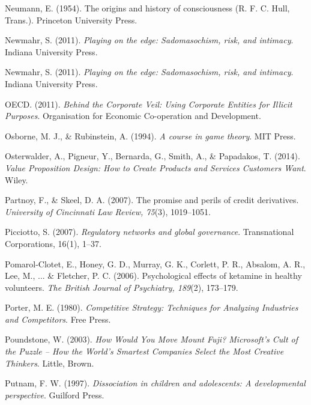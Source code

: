 \begin{thebibliography}{}
    Neumann, E. (1954). The origins and history of consciousness (R. F. C. Hull, Trans.). Princeton University Press.

    Newmahr, S. (2011). \textit{Playing on the edge: Sadomasochism, risk, and intimacy}. Indiana University Press.

    Newmahr, S. (2011). \textit{Playing on the edge: Sadomasochism, risk, and intimacy}. Indiana University Press.


    OECD. (2011). \textit{Behind the Corporate Veil: Using Corporate Entities for Illicit Purposes}. Organisation for Economic Co-operation and Development.

    Osborne, M. J., \& Rubinstein, A. (1994). \textit{A course in game theory}. MIT Press.

    Osterwalder, A., Pigneur, Y., Bernarda, G., Smith, A., \& Papadakos, T. (2014). \textit{Value Proposition Design: How to Create Products and Services Customers Want}. Wiley.


    Partnoy, F., \& Skeel, D. A. (2007). The promise and perils of credit derivatives. \textit{University of Cincinnati Law Review, 75}(3), 1019–1051.

    Picciotto, S. (2007). \textit{Regulatory networks and global governance}. Transnational Corporations, 16(1), 1–37.

    Pomarol-Clotet, E., Honey, G. D., Murray, G. K., Corlett, P. R., Absalom, A. R., Lee, M., ... \& Fletcher, P. C. (2006). Psychological effects of ketamine in healthy volunteers. \textit{The British Journal of Psychiatry, 189}(2), 173–179.

    Porter, M. E. (1980). \textit{Competitive Strategy: Techniques for Analyzing Industries and Competitors}. Free Press.

    Poundstone, W. (2003). \textit{How Would You Move Mount Fuji? Microsoft's Cult of the Puzzle -- How the World's Smartest Companies Select the Most Creative Thinkers}. Little, Brown.

    Putnam, F. W. (1997). \textit{Dissociation in children and adolescents: A developmental perspective}. Guilford Press.


\end{thebibliography}
